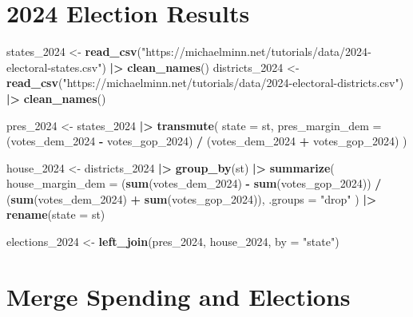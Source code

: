 \documentclass[
  11pt,
]{article}
\newenvironment{Shaded}{\begin{snugshade}}{\end{snugshade}}
\newcommand{\AttributeTok}[1]{\textcolor[rgb]{0.13,0.29,0.53}{#1}}
\newcommand{\FunctionTok}[1]{\textcolor[rgb]{0.13,0.29,0.53}{\textbf{#1}}}
\newcommand{\NormalTok}[1]{#1}
\newcommand{\OtherTok}[1]{\textcolor[rgb]{0.56,0.35,0.01}{#1}}
\newcommand{\SpecialCharTok}[1]{\textcolor[rgb]{0.81,0.36,0.00}{\textbf{#1}}}
\newcommand{\StringTok}[1]{\textcolor[rgb]{0.31,0.60,0.02}{#1}}
\begin{document}
\section{2024 Election Results}\label{election-results}

\begin{Shaded}
\begin{Highlighting}[]
\NormalTok{states\_2024 }\OtherTok{\textless{}{-}} \FunctionTok{read\_csv}\NormalTok{(}\StringTok{"https://michaelminn.net/tutorials/data/2024{-}electoral{-}states.csv"}\NormalTok{) }\SpecialCharTok{|\textgreater{}} \FunctionTok{clean\_names}\NormalTok{()}
\NormalTok{districts\_2024 }\OtherTok{\textless{}{-}} \FunctionTok{read\_csv}\NormalTok{(}\StringTok{"https://michaelminn.net/tutorials/data/2024{-}electoral{-}districts.csv"}\NormalTok{) }\SpecialCharTok{|\textgreater{}} \FunctionTok{clean\_names}\NormalTok{()}

\NormalTok{pres\_2024 }\OtherTok{\textless{}{-}}\NormalTok{ states\_2024 }\SpecialCharTok{|\textgreater{}}
  \FunctionTok{transmute}\NormalTok{(}
    \AttributeTok{state =}\NormalTok{ st,}
    \AttributeTok{pres\_margin\_dem =}\NormalTok{ (votes\_dem\_2024 }\SpecialCharTok{{-}}\NormalTok{ votes\_gop\_2024) }\SpecialCharTok{/}
\NormalTok{      (votes\_dem\_2024 }\SpecialCharTok{+}\NormalTok{ votes\_gop\_2024)}
\NormalTok{  )}

\NormalTok{house\_2024 }\OtherTok{\textless{}{-}}\NormalTok{ districts\_2024 }\SpecialCharTok{|\textgreater{}}
  \FunctionTok{group\_by}\NormalTok{(st) }\SpecialCharTok{|\textgreater{}}
  \FunctionTok{summarize}\NormalTok{(}
    \AttributeTok{house\_margin\_dem =}
\NormalTok{      (}\FunctionTok{sum}\NormalTok{(votes\_dem\_2024) }\SpecialCharTok{{-}} \FunctionTok{sum}\NormalTok{(votes\_gop\_2024)) }\SpecialCharTok{/}
\NormalTok{      (}\FunctionTok{sum}\NormalTok{(votes\_dem\_2024) }\SpecialCharTok{+} \FunctionTok{sum}\NormalTok{(votes\_gop\_2024)),}
    \AttributeTok{.groups =} \StringTok{"drop"}
\NormalTok{  ) }\SpecialCharTok{|\textgreater{}}
  \FunctionTok{rename}\NormalTok{(}\AttributeTok{state =}\NormalTok{ st)}

\NormalTok{elections\_2024 }\OtherTok{\textless{}{-}} \FunctionTok{left\_join}\NormalTok{(pres\_2024, house\_2024, }\AttributeTok{by =} \StringTok{"state"}\NormalTok{)}
\end{Highlighting}
\end{Shaded}

\section{Merge Spending and
Elections}\label{merge-spending-and-elections}
\end{document}
